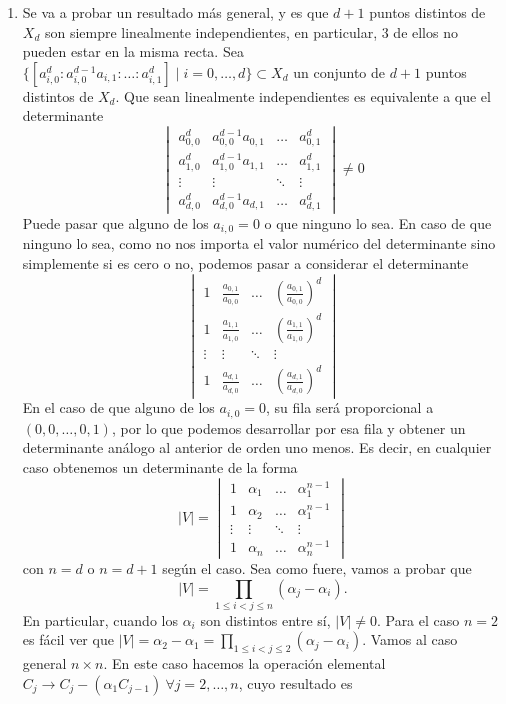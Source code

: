 \documentclass[twoside]{article}
\begin{document}
\begin{solucion}
\begin{enumerate}
\item Se va a probar un resultado más general, y es que $d+1$ puntos distintos de $X_d$ son siempre linealmente independientes, en particular, 3 de ellos no pueden estar en la misma recta. Sea $\{[a_{i,0}^d:a_{i,0}^{d-1}a_{i,1}:\dots:a_{i,1}^d]\mid i=0,\dots, d\}\subset X_d$ un conjunto de $d+1$ puntos distintos de $X_d$. Que sean linealmente independientes es equivalente a que el determinante
\[
\begin{vmatrix}
a_{0,0}^d&a_{0,0}^{d-1}a_{0,1}&\dots&a_{0,1}^d\\
a_{1,0}^d&a_{1,0}^{d-1}a_{1,1}&\dots&a_{1,1}^d\\
\vdots   &\vdots               &\ddots& \vdots\\
a_{d,0}^d&a_{d,0}^{d-1}a_{d,1}&\dots&a_{d,1}^d        
\end{vmatrix}\neq 0
\]
Puede pasar que alguno de los $a_{i,0}=0$ o que ninguno lo sea. En caso de que ninguno lo sea, como no nos importa el valor numérico del determinante sino simplemente si es cero o no, podemos pasar a considerar el determinante
\[
\begin{vmatrix}
1&\frac{a_{0,1}}{a_{0,0}}&\dots& \left(\frac{a_{0,1}}{a_{0,0}}\right)^d\\
1&\frac{a_{1,1}}{a_{1,0}}&\dots& \left(\frac{a_{1,1}}{a_{1,0}}\right)^d\\
\vdots   &\vdots               &\ddots& \vdots\\
1&\frac{a_{d,1}}{a_{d,0}}&\dots& \left(\frac{a_{d,1}}{a_{d,0}}\right)^d       
\end{vmatrix}
\]
En el caso de que alguno de los $a_{i,0}=0$, su fila será proporcional a $(0,0,\dots,0,1)$, por lo que podemos desarrollar por esa fila y obtener un determinante análogo al anterior de orden uno menos. Es decir, en cualquier caso obtenemos un determinante de la forma
\[
|V|=\begin{vmatrix}
1&\alpha_1&\dots& \alpha_1^{n-1}\\
1&\alpha_2&\dots& \alpha_1^{n-1}\\
\vdots   &\vdots               &\ddots& \vdots\\
1&\alpha_n&\dots& \alpha_n^{n-1}       
\end{vmatrix}
\] 
con $n=d$ o $n=d+1$ según el caso. Sea como fuere, vamos a probar que  $$|V|=\prod_{1\leq i<j\leq n}(\alpha_j-\alpha_i).$$ En particular, cuando los $\alpha_i$ son distintos entre sí, $|V|\neq 0$. Para el caso $n=2$ es fácil ver que $|V|=\alpha_2-\alpha_1=\prod_{1\le i<j\le 2} (\alpha_j-\alpha_i)$. Vamos al caso general $n\times n$. En este caso hacemos la operación elemental $C_j\rightarrow C_j-(\alpha_1 C_{j-1})\ \forall j=2,\dots, n$, cuyo resultado es

\end{enumerate}
\end{solucion}
\end{document}
